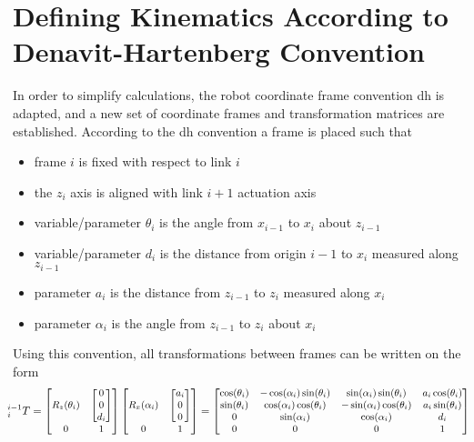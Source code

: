 \section{Defining Kinematics According to Denavit-Hartenberg Convention}
\vspace{-2mm}
In order to simplify calculations, the robot coordinate frame convention \gls{dh} is adapted, and a new set of coordinate frames and transformation matrices are established. According to the \gls{dh} convention a frame is placed such that
\begin{itemize}
\itemsep-1.3mm 
\item frame $i$ is fixed with respect to link $i$
\item the $z_i$ axis is aligned with link $i+1$ actuation axis
\item variable/parameter $\theta_i$ is the angle from $x_{i-1}$ to $x_i$ about $z_{i-1}$
\item variable/parameter $d_i$ is the distance from origin $i-1$ to $x_i$ measured along $z_{i-1}$
\item parameter $a_i$ is the distance from $z_{i-1}$ to $z_i$ measured along $x_i$
\item parameter $\alpha_i$ is the angle from $z_{i-1}$ to $z_i$ about $x_i$
\end{itemize}

Using this convention, all transformations between frames can be written on the form
\begin{equation}
\hspace*{-2mm}
\small
^{i-1}_i T = %
\begin{bmatrix}
R_z(\theta_i) & \begin{bmatrix}0\\ 0\\ d_i\end{bmatrix}\\
0 & 1
\end{bmatrix}
\begin{bmatrix}
R_x(\alpha_i) & \begin{bmatrix}a_i\\ 0\\ 0\end{bmatrix}\\
0 & 1
\end{bmatrix}
=
\begin{bmatrix}
\cos(\theta_i) & -\cos(\alpha_i)\sin(\theta_i) & \sin(\alpha_i)\sin(\theta_i) & a_i \cos(\theta_i)\\
\sin(\theta_i) & \cos(\alpha_i)\cos(\theta_i) & -\sin(\alpha_i)\cos(\theta_i) & a_i \sin(\theta_i)\\
0 & \sin(\alpha_i) & \cos(\alpha_i) & d_i\\
0 & 0 & 0 & 1
\end{bmatrix}
\end{equation}

